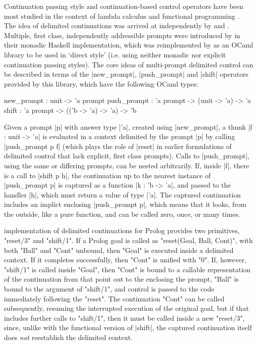 Continuation passing style and continuation-based control operators have been most studied in the
context of lambda calculus and functional programming \citep{SussmanSteele1975}.
The idea of delimited continuations was arrived at independently by \cite{Felleisen1988} and
\cite{DanvyFilinski1990}. Multiple, first class, independently addressible prompts were introduced
by \cite{DyvbigJonesSabry2005} in their monadic Haskell implementation, which was reimplemented
by \cite{Kiselyov2012} as an OCaml library to be used in `direct style'
(i.e. using neither monadic nor explicit continuation passing styles). The core ideas of multi-prompt delimited
control can be described in terms of the |new_prompt|, |push_prompt| and |shift| operators provided by
this library, which have the following OCaml types:
\begin{ocamlet}
	new_prompt	: unit -> 'a prompt
	push_prompt	: 'a prompt -> (unit -> 'a) -> 'a
	shift        : 'a prompt -> (('b -> 'a) -> 'a) -> 'b
\end{ocamlet}
Given a prompt |p| with answer type |'a|, created using |new_prompt|, a thunk |f : unit -> 'a| is evaluated
in a context delimited by the
prompt |p| by calling |push_prompt p f| (which plays the role of |reset| in earlier
formulations of delimited control that lack explicit, first class prompts).
Calls to |push_prompt|, using the same or differing prompts, can be nested arbitrarily.
If, inside |f|, there is a call to |shift p h|, the
continuation up to the nearest instance of |push_prompt p| is captured as a function |k : 'b -> 'a|, and passed to the handler
|h|, which must return a value of type |'a|. The captured continuation includes an implict
enclosing |push_prompt p|, which means that it looks, from the outside,
like a pure function, and can be called zero, once, or many times.

 implementation of delimited continuations for Prolog provides two
primitives, "reset/3" and "shift/1". If a Prolog goal is called as "reset(Goal, Ball, Cont)", with both
"Ball" and "Cont" unbound, then "Goal" is executed inside a delimited context. If it completes
successfully, then "Cont" is unified with "0".  If, however, "shift/1" is called inside "Goal", then "Cont" is bound
to a callable representation of the continuation from that point out to the enclosing the prompt, "Ball"
is bound to the argument of "shift/1", and control is passed to the code immediately following the "reset".
The continuation "Cont" can be called subsequently, resuming the interrupted execution of the original
goal, but if that includes further calls to "shift/1", then it must be called inside a new
"reset/3", since, unlike with the functional version of |shift|, the captured continuation itself
does \emph{not} reestablish the delimited context.

